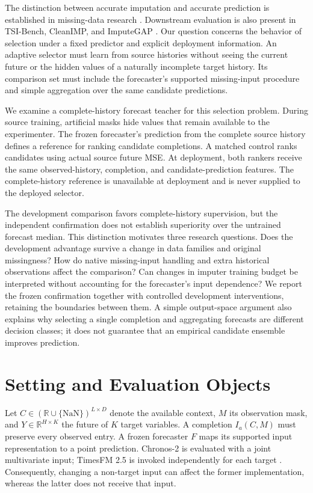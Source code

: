 \documentclass{article}
\newcommand{\R}{\mathbb{R}}
\begin{document}
The distinction between accurate imputation and accurate prediction is established in missing-data research \citep{lemorvan2021good}. Downstream evaluation is also present in TSI-Bench, CleanIMP, and ImputeGAP \citep{du2024tsibench,cleanimp,nater2025imputegap}. Our question concerns the behavior of selection under a fixed predictor and explicit deployment information. An adaptive selector must learn from source histories without seeing the current future or the hidden values of a naturally incomplete target history. Its comparison set must include the forecaster's supported missing-input procedure and simple aggregation over the same candidate predictions.

We examine a complete-history forecast teacher for this selection problem. During source training, artificial masks hide values that remain available to the experimenter. The frozen forecaster's prediction from the complete source history defines a reference for ranking candidate completions. A matched control ranks candidates using actual source future MSE. At deployment, both rankers receive the same observed-history, completion, and candidate-prediction features. The complete-history reference is unavailable at deployment and is never supplied to the deployed selector.

The development comparison favors complete-history supervision, but the independent confirmation does not establish superiority over the untrained forecast median. This distinction motivates three research questions. Does the development advantage survive a change in data families and original missingness? How do native missing-input handling and extra historical observations affect the comparison? Can changes in imputer training budget be interpreted without accounting for the forecaster's input dependence? We report the frozen confirmation together with controlled development interventions, retaining the boundaries between them. A simple output-space argument also explains why selecting a single completion and aggregating forecasts are different decision classes; it does not guarantee that an empirical candidate ensemble improves prediction.

\section{Setting and Evaluation Objects}

Let $C\in(\R\cup\{\mathrm{NaN}\})^{L\times D}$ denote the available context, $M$ its observation mask, and $Y\in\R^{H\times K}$ the future of $K$ target variables. A completion $I_a(C,M)$ must preserve every observed entry. A frozen forecaster $F$ maps its supported input representation to a point prediction. Chronos-2 is evaluated with a joint multivariate input; TimesFM 2.5 is invoked independently for each target \citep{ansari2025chronos2,google2025timesfm25}. Consequently, changing a non-target input can affect the former implementation, whereas the latter does not receive that input.
\end{document}
